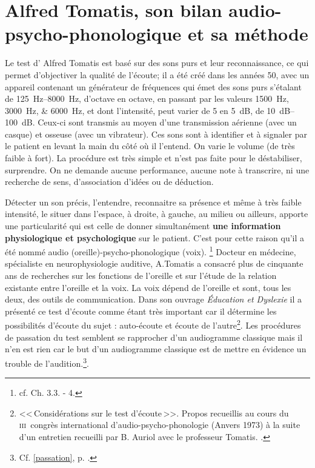 \chapter{Alfred Tomatis, son bilan audio-psycho-phonologique et sa méthode}
 
 Le test d' Alfred Tomatis est basé sur des sons purs et leur
 reconnaissance, ce qui permet d'objectiver la qualité de l'écoute; il a été créé dans les années 50, avec un
  appareil contenant un générateur de fréquences qui émet des sons
  purs s'étalant de \SIrange{125}{8000}{\Hz}, d'octave en octave, en passant par les valeurs
\SIlist{1500;3000;6000}{\Hz}, et dont l'intensité, peut varier de 5 en \SI{5}{\dB}, de \SIrange{10}{100}{\dB}. 
Ceux-ci sont transmis au moyen d'une
  transmission aérienne (avec un casque) et osseuse (avec un vibrateur). Ces sons sont à identifier et à
  signaler par le patient en levant la main du côté où il l'entend. On
  varie le volume (de très faible à fort). La procédure est très
  simple et n'est pas faite pour le déstabiliser, surprendre. On ne 
  demande aucune performance, aucune note à transcrire, ni une 
  recherche de sens, d'association d'idées ou de
  déduction.
 
 Détecter un son précis, l'entendre, reconnaitre sa présence et même à très
 faible intensité, le situer dans l'espace, à droite, à gauche, au
 milieu ou ailleurs,  apporte une particularité qui est celle de  donner simultanément  \textbf{une information
   physiologique et psychologique} sur le patient.
 C'est pour cette raison qu'il a été nommé
 audio (oreille)-psycho-phonologique (voix). \footnote{cf. Ch. 3.3. - 4.}
  Docteur en médecine, spécialiste en neurophysiologie auditive,
  A.Tomatis a consacré plus de cinquante ans de recherches sur les
  fonctions de l'oreille et  sur l'étude de la relation existante entre
  l'oreille et la voix.  La voix dépend de l'oreille et sont, tous les
  deux, des outils de communication.
  Dans son ouvrage \emph{Éducation et
    Dyslexie}\autocite{tomatis:education} il
  a présenté ce test d'écoute comme étant très important car il détermine les
  possibilités d'écoute du sujet : auto-écoute et écoute de
  l'autre\footnote{<<\,Considérations sur le test d'écoute\,>>. Propos
  	recueillis au cours du \textsc{iii}\ieme\ congrès international
  	d'audio-psycho-phonologie (Anvers 1973) à la suite d'un entretien recueilli par B. Auriol
  	avec le professeur Tomatis. \autocite{auriol_stress}.}. 
   Les procédures de passation du test semblent
  se rapprocher d'un audiogramme classique mais il n'en est rien car
  le but d'un audiogramme classique  est de mettre en évidence un
  trouble de l'audition.\footnote{Cf. \ref{passation}, p. 
    \pageref{passation}.}.
  
